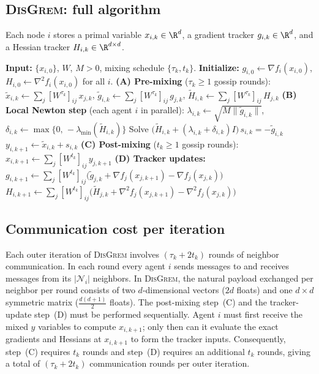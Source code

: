 \documentclass[review,onefignum,onetabnum]{siamart171218}
\begin{document}
	\subsection{\textsc{DisGrem}: full algorithm}\label{ssec:disgrem}
	
	Each node $i$ stores a primal variable $x_{i,k}\in\R^d$, a gradient tracker $g_{i,k}\in\R^d$,
	and a Hessian tracker $H_{i,k}\in\R^{d\times d}$.
	
	\begin{algorithm}[htbp]
		\caption{\textsc{DisGrem}}
		\label{alg:disgrem}
		\small
		\begin{algorithmic}[1]
			\State \textbf{Input:} $\{x_{i,0}\}$, $W$, $M>0$, mixing schedule $\{\tau_k, t_k\}$.
			\State \textbf{Initialize:} $g_{i,0}\gets\nabla f_i(x_{i,0})$, $H_{i,0}\gets\nabla^2 f_i(x_{i,0})$ for all $i$.
			\State \textbf{(A) Pre-mixing} ($\tau_k\ge 1$ gossip rounds):
			\Statex\qquad $\tilde x_{i,k}\gets\textstyle\sum_j [W^{\tau_k}]_{ij}\,x_{j,k}$,\quad
			$\tilde g_{i,k}\gets\textstyle\sum_j [W^{\tau_k}]_{ij}\,g_{j,k}$,\quad
			$\tilde H_{i,k}\gets\textstyle\sum_j [W^{\tau_k}]_{ij}\,H_{j,k}$
			\State \textbf{(B) Local Newton step} (each agent $i$ in parallel):
			\Statex\qquad $\lambda_{i,k}\gets\sqrt{M\|\tilde g_{i,k}\|}$,\quad
			$\delta_{i,k}\gets\max\{0,\,-\lambda_{\min}(\tilde H_{i,k})\}$
			\Statex\qquad Solve $\bigl(\tilde H_{i,k}+(\lambda_{i,k}+\delta_{i,k})I\bigr)\,s_{i,k}=-\tilde g_{i,k}$
			\Statex\qquad $y_{i,k+1}\gets\tilde x_{i,k}+s_{i,k}$
			\State \textbf{(C) Post-mixing} ($t_k\ge 1$ gossip rounds):
			\Statex\qquad $x_{i,k+1}\gets\textstyle\sum_j [W^{t_k}]_{ij}\,y_{j,k+1}$
			\State \textbf{(D) Tracker updates:}
			\Statex\qquad $g_{i,k+1}\gets\textstyle\sum_j [W^{t_k}]_{ij}\bigl(\tilde g_{j,k}+\nabla f_j(x_{j,k+1})-\nabla f_j(x_{j,k})\bigr)$
			\Statex\qquad $H_{i,k+1}\gets\textstyle\sum_j [W^{t_k}]_{ij}\bigl(\tilde H_{j,k}+\nabla^2 f_j(x_{j,k+1})-\nabla^2 f_j(x_{j,k})\bigr)$
			\EndFor
		\end{algorithmic}
	\end{algorithm}
	
	\subsection{Communication cost per iteration}\label{ssec:comm}
	
	Each outer iteration of \textsc{DisGrem} involves $(\tau_k + 2t_k)$ rounds of neighbor communication.
	In each round every agent $i$ sends messages to and receives messages from its $|\mathcal N_i|$ neighbors.
	In \textsc{DisGrem}, the natural payload exchanged per neighbor per round consists of
	two $d$-dimensional vectors ($2d$ floats) and
	one $d\times d$ symmetric matrix ($\tfrac{d(d+1)}{2}$ floats).
	The post-mixing step~(C) and the tracker-update step~(D) must be performed sequentially.
	Agent $i$ must first receive the mixed $y$ variables to compute $x_{i,k+1}$; only then can it evaluate the exact gradients and Hessians at $x_{i,k+1}$ to form the tracker inputs.
	Consequently, step~(C) requires $t_k$ rounds and step~(D) requires an additional $t_k$ rounds, giving a total of $(\tau_k+2t_k)$ communication rounds per outer iteration.
	
\end{document}
